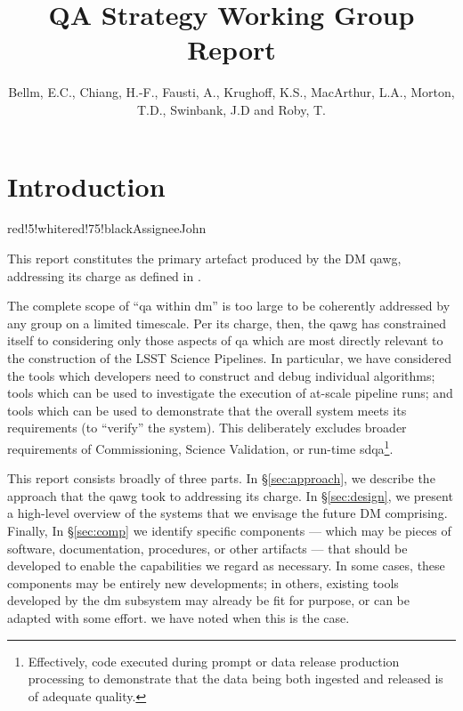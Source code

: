 \documentclass[DM,authoryear,toc,lsstdraft]{lsstdoc}
\title{QA Strategy Working Group Report}
\author{%
Bellm, E.C.,
Chiang, H.-F.,
Fausti, A.,
Krughoff, K.S.,
MacArthur, L.A.,
Morton, T.D.,
Swinbank, J.D and
Roby, T.
}
\date{\vcsDate}
\begin{document}
\newcommand{\assign}[1]{
  \begin{admonition}{red!5!white}{red!75!black}{Assignee}{}#1\end{admonition}
}

\maketitle


\section{Introduction}
\label{sec:intro}

\assign{John}

This report constitutes the primary artefact produced by the DM \gls{qawg},
addressing its charge as defined in .

The complete scope of ``\gls{qa} within \gls{dm}'' is too large to be
coherently addressed by any group on a limited timescale. Per its charge,
then, the \gls{qawg} has constrained itself to considering only those aspects
of \gls{qa} which are most directly relevant to the construction of the LSST
Science Pipelines. In particular, we have considered the tools which
developers need to construct and debug individual algorithms; tools which can
be used to investigate the execution of at-scale pipeline runs; and tools
which can be used to demonstrate that the overall system meets its
requirements (to ``verify'' the system). This deliberately excludes broader
requirements of Commissioning, Science Validation, or run-time
\gls{sdqa}\footnote{Effectively, code executed during prompt or data release
production processing to demonstrate that the data being both ingested and
released is of adequate quality.}.

This report consists broadly of three parts. In \S\ref{sec:approach}, we
describe the approach that the \gls{qawg} took to addressing its charge. In
\S\ref{sec:design}, we present a high-level overview of the systems that we
envisage the future DM comprising. Finally, In \S\ref{sec:comp} we identify
specific components --- which may be pieces of software, documentation,
procedures, or other artifacts --- that should be developed to enable the
capabilities we regard as necessary. In some cases, these components may be
entirely new developments; in others, existing tools developed by the \gls{dm}
subsystem may already be fit for purpose, or can be adapted with some effort.
we have noted when this is the case.
\end{document}
